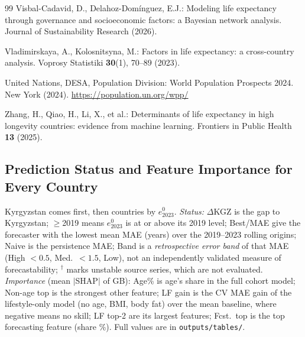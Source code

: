 \documentclass[runningheads]{llncs}
\begin{document}
\begin{thebibliography}{99}
Visbal-Cadavid, D., Delahoz-Domínguez, E.J.: Modeling life expectancy through governance and
socioeconomic factors: a Bayesian network analysis. Journal of Sustainability Research (2026).

Vladimirskaya, A., Kolosnitsyna, M.: Factors in life expectancy: a cross-country analysis. Voprosy
Statistiki \textbf{30}(1), 70--89 (2023). 

United Nations, DESA, Population Division: World Population Prospects 2024. New York (2024).
\url{https://population.un.org/wpp/}

Zhang, H., Qiao, H., Li, X., et al.: Determinants of life expectancy in high longevity countries:
evidence from machine learning. Frontiers in Public Health \textbf{13} (2025).

\end{thebibliography}

\appendix
\begin{landscape}
\section{Prediction Status and Feature Importance for Every Country}\label{app:countries}

\small Kyrgyzstan comes first, then countries by $e^0_{2023}$. \emph{Status:} $\Delta$KGZ is the gap
to Kyrgyzstan; $\geq$2019 means $e^0_{2023}$ is at or above its 2019 level; Best/MAE give the
forecaster with the lowest mean MAE (years) over the 2019--2023 rolling origins; Naive is the
persistence MAE; Band is a \emph{retrospective error band} of that MAE (High $<0.5$, Med.\ $<1.5$,
Low), not an independently validated measure of forecastability; $^\dagger$ marks unstable source
series, which are not evaluated. \emph{Importance} (mean $|$SHAP$|$ of GB):
Age\% is age's share in the full cohort model; Non-age top is the strongest other feature; LF gain is
the CV MAE gain of the lifestyle-only model (no age, BMI, body fat) over the mean baseline, where
negative means no skill; LF top-2 are its largest features; Fcst.\ top is the top forecasting feature (share
\%). Full values are in \texttt{outputs/tables/}.


\end{landscape}
\end{document}
